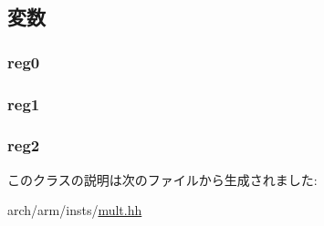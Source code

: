 \subsection{変数}
\hypertarget{classArmISA_1_1Mult3_aa6e6898ab26fd030ad0d0782b6a48a3c}{
\subsubsection[{reg0}]{ {\bf reg0}}}
\label{classArmISA_1_1Mult3_aa6e6898ab26fd030ad0d0782b6a48a3c}
\hypertarget{classArmISA_1_1Mult3_a3c9e30fb19ad22fe7061b3aec6c3eeea}{
\subsubsection[{reg1}]{ {\bf reg1}}}
\label{classArmISA_1_1Mult3_a3c9e30fb19ad22fe7061b3aec6c3eeea}
\hypertarget{classArmISA_1_1Mult3_a0d7ce7c65782c859c4233d55f6424a2e}{
\subsubsection[{reg2}]{ {\bf reg2}}}
\label{classArmISA_1_1Mult3_a0d7ce7c65782c859c4233d55f6424a2e}


このクラスの説明は次のファイルから生成されました:\begin{DoxyCompactItemize}
\item 
arch/arm/insts/\hyperlink{mult_8hh}{mult.hh}\end{DoxyCompactItemize}
